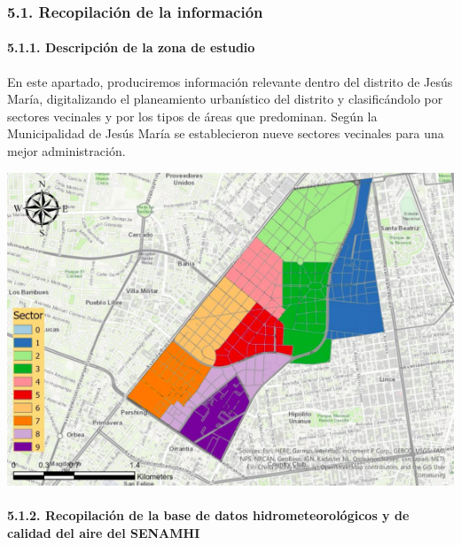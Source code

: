 \documentclass[
]{article}
\begin{document}
\hypertarget{recopilaciuxf3n-de-la-informaciuxf3n}{%
\subsubsection{5.1. Recopilación de la
información}\label{recopilaciuxf3n-de-la-informaciuxf3n}}

\hypertarget{descripciuxf3n-de-la-zona-de-estudio}{%
\paragraph{5.1.1. Descripción de la zona de
estudio}\label{descripciuxf3n-de-la-zona-de-estudio}}

En este apartado, produciremos información relevante dentro del distrito
de Jesús María, digitalizando el planeamiento urbanístico del distrito y
clasificándolo por sectores vecinales y por los tipos de áreas que
predominan. Según la Municipalidad de Jesús María se establecieron nueve
sectores vecinales para una mejor administración.

\begin{center}\includegraphics{Img/Sectores} \end{center}

\hypertarget{recopilaciuxf3n-de-la-base-de-datos-hidrometeoroluxf3gicos-y-de-calidad-del-aire-del-senamhi}{%
\paragraph{5.1.2. Recopilación de la base de datos hidrometeorológicos y
de calidad del aire del
SENAMHI}\label{recopilaciuxf3n-de-la-base-de-datos-hidrometeoroluxf3gicos-y-de-calidad-del-aire-del-senamhi}}
\end{document}
